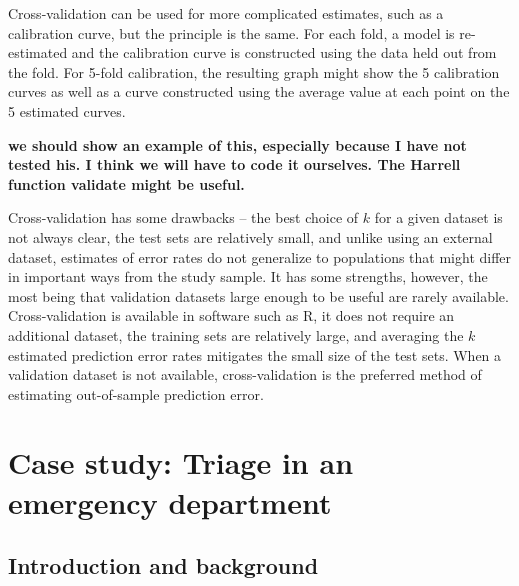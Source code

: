 Cross-validation can be used for more complicated estimates, such as a calibration curve, but the principle is the same.  For each fold, a model is re-estimated and the calibration curve is constructed using the data held out from the fold.  For 5-fold calibration, the resulting graph might show the 5 calibration curves as well as a curve constructed using the average value at each point on the 5 estimated curves. 

\textbf{we should show an example of this, especially because I have not tested his.  I think we will have to code it ourselves.  The Harrell function validate  might be useful.}

Cross-validation has some drawbacks -- the best choice of $k$ for a given dataset is not always clear, the test sets are relatively small, and unlike using an external dataset, estimates of error rates do not generalize to populations that might differ in  important ways from the study sample.  It has some strengths, however, the most being that validation datasets large enough to be useful are rarely available.  Cross-validation is available in software such as \textsf{R}, it does not require an additional dataset, the training sets are relatively large, and averaging the $k$ estimated prediction error rates mitigates the small size of the test sets.  When a validation dataset is not available, cross-validation is the preferred method of estimating out-of-sample prediction error.



\section{Case study: Triage in an emergency department}
\label{caseStudy}

\subsection{Introduction and background}
\label{IntroDanishED}

